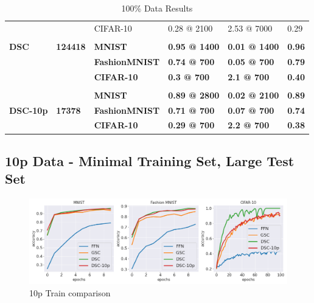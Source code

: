 \documentclass{article}
\begin{document}
\begin{table}[H]
\begin{tabular}{llllll}
                                  &                                 & CIFAR-10                 & 0.28 @ 2100          & 2.53 @ 7000          & 0.29                     \\
                                  &                                 &                          &                      &                      &                          \\
\textbf{DSC}                      & \textbf{124418}                 & \textbf{MNIST}           & \textbf{0.95 @ 1400} & \textbf{0.01 @ 1400} & \textbf{0.96}            \\
\textbf{}                         & \textbf{}                       & \textbf{FashionMNIST}    & \textbf{0.74 @ 700}  & \textbf{0.05 @ 700}  & \textbf{0.79}            \\
\textbf{}                         & \textbf{}                       & \textbf{CIFAR-10}        & \textbf{0.3 @ 700}   & \textbf{2.1 @ 700}   & \textbf{0.40}            \\
                                  &                                 &                          &                      &                      &                          \\
\multirow{3}{*}{\textbf{DSC-10p}} & \multirow{3}{*}{\textbf{17378}} & \textbf{MNIST}           & \textbf{0.89 @ 2800} & \textbf{0.02 @ 2100} & \textbf{0.89}            \\
                                  &                                 & \textbf{FashionMNIST}    & \textbf{0.71 @ 700}  & \textbf{0.07 @ 700}  & \textbf{0.74}            \\
                                  &                                 & \textbf{CIFAR-10}        & \textbf{0.29 @ 700}  & \textbf{2.2 @ 700}   & \textbf{0.38}            \\ \cmidrule(l){3-6} 
\end{tabular}
\caption{100\% Data Results}
\label{tab:100p_data_table}
\end{table}


\subsection{10p Data - Minimal Training Set, Large Test Set}
\begin{figure}[h!]
\centering
\includegraphics[scale=0.3]{paper/10p_runs.png}
\caption{10p Train comparison}
\label{fig:10p_runs}
\end{figure}
\end{document}
